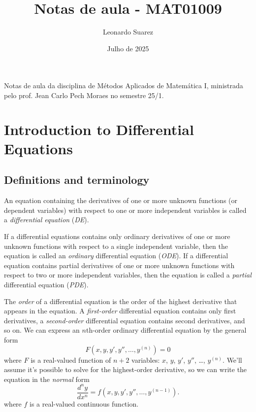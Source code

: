 \documentclass{article}
\title{Notas de aula - MAT01009}
\author{Leonardo Suarez}
\date{Julho de 2025}
\begin{document}
\maketitle

Notas de aula da disciplina de Métodos Aplicados de Matemática I, ministrada pelo prof. Jean Carlo Pech Moraes no semestre 25/1.

\tableofcontents

\section{Introduction to Differential Equations}

\subsection{Definitions and terminology}

\begin{defn}
    An equation containing the derivatives of one or more unknown functions (or dependent variables) with respect to one or more independent variables is called a \emph{differential equation} (\emph{DE}).
\end{defn}

If a differential equations contains only ordinary derivatives of one or more unknown functions with respect to a single independent variable, then the equation is called an \emph{ordinary} differential equation (\emph{ODE}). If a differential equation contains partial derivatives of one or more unknown functions with respect to two or more independent variables, then the equation is called a \emph{partial} differential equation (\emph{PDE}).

The \emph{order} of a differential equation is the order of the highest derivative that appears in the equation. A \emph{first-order} differential equation contains only first derivatives, a \emph{second-order} differential equation contains second derivatives, and so on. We can express an \(n\)th-order ordinary differential equation by the general form
\begin{equation}
    F(x, y, y', y'', \ldots, y^{(n)}) = 0
\end{equation}
where \(F\) is a real-valued function of \(n+2\) variables: \(x\), \(y\), \(y'\), \(y''\), \ldots, \(y^{(n)}\). We'll assume it's possible to solve for the highest-order derivative, so we can write the equation in the \emph{normal }form
\begin{equation}
    \frac{d^n y}{dx^n} = f(x, y, y', y'', \ldots, y^{(n-1)}).
\end{equation}
where \(f\) is a real-valued continuous function.
\end{document}

